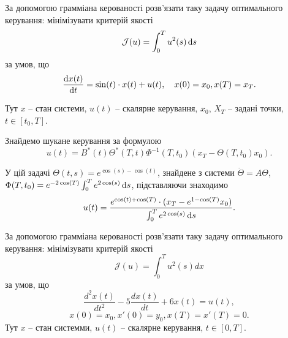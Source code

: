 \begin{problem}
	За допомогою грамміана керованості розв'язати таку задачу оптимального керування: мінімізувати критерій якості \[ \mathcal{J} (u) = \int_0^T u^2(s) \mathop{}\!\mathrm{d} s\] за умов, що \[ \frac{\mathop{}\!\mathrm{d} x(t)}{\mathop{}\!\mathrm{d} t} = \sin(t) \cdot x(t) + u(t), \quad x (0) = x_0, x (T) = x_T. \]

	Тут $x$ -- стан системи, $u(t)$ -- скалярне керування, $x_0$, $X_T$ -- задані точки, $t \in [t_0, T]$.
\end{problem}

\begin{solution}
	Знайдемо шукане керування за формулою \[ u(t) = B^*(t) \Theta^*(T, t) \Phi^{-1}(T, t_0) (x_T - \Theta(T, t_0) x_0). \]

	У цій задачі $\Theta(t, s) = e^{\cos (s) - \cos (t)}$, знайдене з системи $\dot \Theta = A \Theta$, $\Phi(T, t_0) = e^{-2 \cos (T)} \int_0^T e^{2 \cos (s)} \mathop{}\!\mathrm{d} s$, підставляючи знаходимо \[ u(t) = \frac{e^{\cos (t) + \cos (T)} \cdot (x_T - e^{1 - \cos (T)} x_0)}{\int_0^T e^{2 \cos (s)} \mathop{}\!\mathrm{d} s}. \]
\end{solution}

\begin{problem}
    За допомогою грамміана керованості розв'язати таку задачу оптимального керування: мінімізувати критерій якості
    \[ \mathcal{J}(u) = \int_0^T u^2(s) dx \]
    за умов, що
    \[ \dfrac{d^2x(t)}{dt^2} - 5\dfrac{dx(t)}{dt} + 6x(t) = u(t), \]
    \[ x(0) = x_0, x'(0) = y_0, x(T) = x'(T) = 0.\]
    Тут $x$ -- стан системми, $u(t)$ -- скалярне керування, $t \in [0, T]$.
\end{problem}

